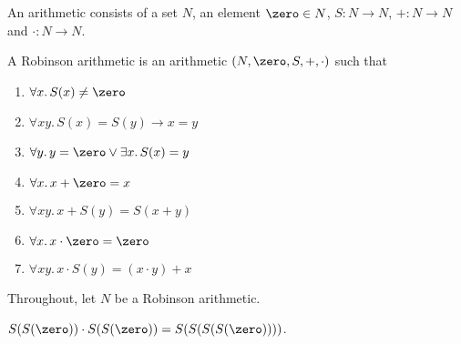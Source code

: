 \begin{theory}
   An arithmetic consists of
   a set $N$, an element $\zero \in N$,
   $S : N\to N$,
   $+: N\to N$
   and $\cdot : N\to N$.
\end{theory}

\begin{theory}
   A Robinson arithmetic is an arithmetic $(N,\zero,S,+,\cdot)$
   such that
   \begin{enumerate}
      \item $\forall x.\, S(x)\neq \zero$
      \item $\forall x y.\, S(x) = S(y) \to x = y$
      \item $\forall y.\, y = \zero \lor \exists x.\, S(x) = y$
      \item $\forall x.\, x + \zero = x$
      \item $\forall x y.\, x + S(y) = S(x+y)$
      \item $\forall x.\, x\cdot \zero = \zero$
      \item $\forall x y.\, x\cdot S(y) = (x\cdot y) + x$
   \end{enumerate}
\end{theory}

Throughout, let $N$ be a Robinson arithmetic.

\begin{theorem}
    $S(S(\zero))\cdot S(S(\zero)) = S(S(S(S(\zero))))$.
\end{theorem}